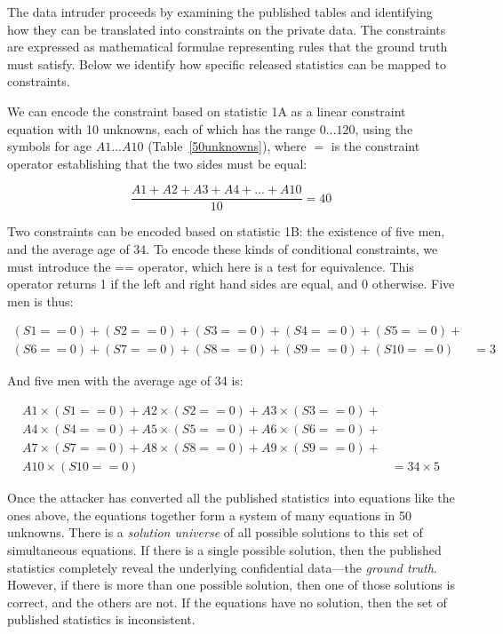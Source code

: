 \documentclass[runningheads]{llncs}
\begin{document}
The data intruder proceeds by examining the published tables and
identifying how they can be translated into constraints on the private
data. The constraints are expressed as mathematical formulae
representing rules that the ground truth must satisfy. Below we
identify how specific released statistics can be mapped to
constraints.

We can encode the constraint based on statistic 1A as a linear
constraint equation with 10 unknowns, each of which has the range
$0\ldots120$, using the symbols for age $A1...A10$
(Table~\ref{50unknowns}), where $=$ is the constraint operator
establishing that the two sides must be equal:

\begin{equation}
\frac{A1 + A2 + A3 + A4 +...+ A10}{10} = 40
\end{equation}\label{eq1}

Two constraints can be encoded based on statistic 1B: the existence of
five men, and the average age of 34. To encode these kinds of
conditional constraints, we must introduce the == operator,
which here is a test for equivalence. This operator returns 1 if the
left and right hand sides are equal, and 0 otherwise. 
Five men is thus:

\begin{equation}
\begin{split}
(S1==0) + (S2==0) + (S3==0) + (S4==0) + (S5==0) +  & \\
(S6==0) + (S7==0) + (S8==0) + (S9==0) + (S10==0) & = 3 
\end{split}
\end{equation}

And five men with the average age of 34 is:

\begin{equation}
\begin{split}
A1\times(S1==0) + A2\times(S2==0) + A3\times(S3==0) + &\\
A4\times(S4==0) + A5\times(S5==0) + A6\times(S6==0) + &\\
A7\times(S7==0) + A8\times(S8==0) + A9\times(S9==0) + &\\
                                    A10\times(S10==0) & = 34\times5
\end{split}
\end{equation}

Once the attacker has converted all the published statistics
into equations like the ones above, the equations together form a
system of many equations in 50 unknowns. 
There is a \textit{solution universe} of all possible solutions to
this set of simultaneous equations. If there is a single possible
solution, then the published statistics completely reveal the
underlying confidential data---the \emph{ground truth}. However, if
there is more than one possible solution, then one of those solutions
is correct, and the others are not. If the equations have no solution,
then the set of published statistics is inconsistent.
\end{document}
